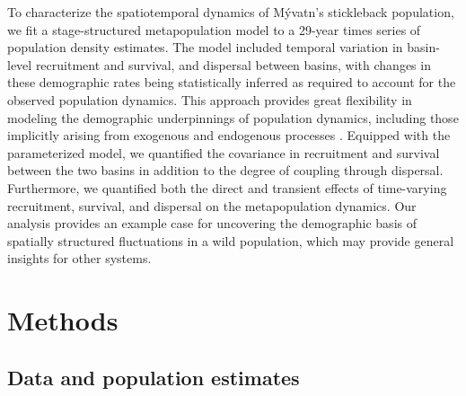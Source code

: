 \documentclass[11pt]{article}
\begin{document}
To characterize the spatiotemporal dynamics of M\'{y}vatn's stickleback population, 
we fit a stage-structured metapopulation model \citep{caswell2001matrix}
to a 29-year times series of population density estimates.
The model included temporal variation in basin-level recruitment and survival, 
and dispersal between basins,
with changes in these demographic rates being statistically inferred 
as required to account for the observed population dynamics.
This approach provides great flexibility in modeling the demographic underpinnings of 
population dynamics,
including those implicitly arising from exogenous and endogenous processes
\citep{zeng1998, ives2012}.
Equipped with the parameterized model, 
we quantified the covariance in recruitment and survival between the two basins
in addition to the degree of coupling through dispersal.
Furthermore, we quantified both the direct and transient effects of 
time-varying recruitment, survival, and dispersal
on the metapopulation dynamics.
Our analysis provides an example case for uncovering the demographic basis 
of spatially structured fluctuations in a wild population, 
which may provide general insights for other systems. 





\section*{Methods} 



\subsection*{Data and population estimates} 
\end{document}
